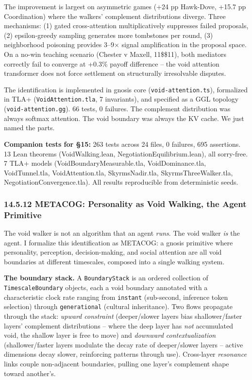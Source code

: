 \documentclass[
  11pt,
]{article}
\begin{document}
The improvement is largest on asymmetric games (+24 pp Hawk-Dove, +15.7
pp Coordination) where the walkers' complement distributions diverge.
Three mechanisms: (1) gated cross-attention multiplicatively suppresses
failed proposals, (2) epsilon-greedy sampling generates more tombstones
per round, (3) neighborhood poisoning provides 3--9\(\times\) signal
amplification in the proposal space. On a no-win teaching scenario
(Chester v Maxell, 11\$\times\$11), both mediators correctly fail to
converge at +0.3\% payoff difference -- the void attention transformer
does not force settlement on structurally irresolvable disputes.

The identification is implemented in gnosis core
(\texttt{void-attention.ts}), formalized in TLA+
(\texttt{VoidAttention.tla}, 7 invariants), and specified as a GGL
topology (\texttt{void-attention.gg}). 66 tests, 0 failures. The
complement distribution was always softmax attention. The void boundary
was always the KV cache. We just named the parts.

\textbf{Companion tests for §15:} 263 tests across 24 files, 0 failures,
695 assertions. 13 Lean theorems (VoidWalking.lean,
NegotiationEquilibrium.lean), all sorry-free. 7 TLA+ models
(VoidBoundaryMeasurable.tla, VoidDominance.tla, VoidTunnel.tla,
VoidAttention.tla, SkyrmsNadir.tla, SkyrmsThreeWalker.tla,
NegotiationConvergence.tla). All results reproducible from deterministic
seeds.

\subsubsection{14.5.12 METACOG: Personality as Void Walking, the Agent
Primitive}\label{metacog-personality-as-void-walking-the-agent-primitive}

The void walker is not an algorithm that an agent \emph{runs}. The void
walker \emph{is} the agent. I formalize this identification as METACOG:
a gnosis primitive where personality, perception, decision-making, and
social attention are all void boundaries at different timescales,
composed into a single walking system.

\textbf{The boundary stack.} A \texttt{BoundaryStack} is an ordered
collection of \texttt{TimescaleBoundary} objects, each a void boundary
annotated with a characteristic clock rate ranging from \texttt{instant}
(sub-second, inference token selection) through \texttt{generational}
(cultural inheritance). Two flows propagate through the stack:
\emph{upward constraint} (deeper/slower layers bias shallower/faster
layers' complement distributions -- where the deep layer has \emph{not}
accumulated void, the shallow layer is free to move) and \emph{downward
contextualization} (shallower/faster layers modulate the decay rate of
deeper/slower layers -- active dimensions decay slower, reinforcing
patterns through use). Cross-layer \emph{resonance} links couple
non-adjacent boundaries, pulling one layer's complement shape toward
another's.
\end{document}
